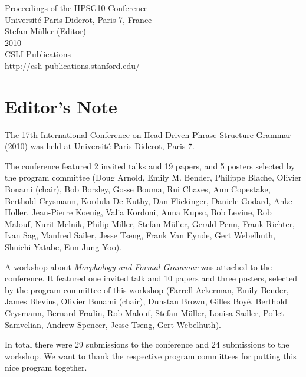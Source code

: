 \documentclass[11pt,a4paper,fleqn]{article}
\begin{document}
\begin{center}
{\Large
                Proceedings of the HPSG10 Conference\\[\baselineskip]

                       Université Paris Diderot, Paris 7, France\\[\baselineskip]

                        Stefan M{\"u}ller (Editor)\\[\baselineskip]

                                2010\\[\baselineskip]

                          CSLI Publications\\[\baselineskip]

              http://csli-publications.stanford.edu/
}
\end{center}
\newpage
\tableofcontents

\newpage

\section{Editor's Note}

The 17th International Conference on Head-Driven Phrase Structure Grammar (2010) was held at Université Paris Diderot, Paris 7.

The conference featured 2 invited talks and 19 papers, and 5 posters selected by the program committee (Doug Arnold,
Emily M. Bender, Philippe Blache, Olivier Bonami (chair), Bob Borsley, Gosse Bouma, Rui Chaves, Ann
Copestake,
Berthold Crysmann, Kordula De Kuthy, Dan Flickinger, Daniele Godard, Anke Holler, Jean-Pierre
Koenig, Valia Kordoni, Anna Kupsc, Bob Levine, Rob Malouf, Nurit Melnik, Philip Miller, Stefan
Müller, Gerald Penn, Frank Richter, Ivan Sag, Manfred Sailer, Jesse Tseng, Frank Van Eynde, Gert
Webelhuth, Shuichi Yatabe, Eun-Jung Yoo).

A workshop about \emph{Morphology and Formal Grammar}
was attached to the conference. It featured one invited talk and 10 papers and three posters, selected by the program
committee of this workshop (Farrell Ackerman,
Emily Bender,
James Blevins,
Olivier Bonami (chair),
Dunstan Brown,
Gilles Boyé,
Berthold Crysmann,
Bernard Fradin,
Rob Malouf,
Stefan Müller,
Louisa Sadler,
Pollet Samvelian,
Andrew Spencer,
Jesse Tseng,
Gert Webelhuth).


In total there were 29  submissions to the conference and 24 submissions to the workshop.
We want to thank the respective program committees for putting this nice program together.
\end{document}
